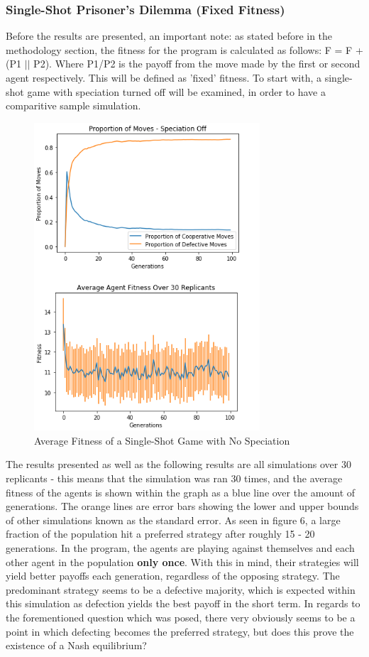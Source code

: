 \documentclass[12pt,a4paper]{article}
\begin{document}
\subsubsection{Single-Shot Prisoner's Dilemma (Fixed Fitness)}

Before the results are presented, an important note: as stated before in the methodology section, the fitness for the program is calculated as follows: F = F + (P1 $||$  P2). Where P1/P2 is the payoff from the move made by the first or second agent respectively. This will be defined as 'fixed' fitness. To start with, a single-shot game with speciation turned off will be examined, in order to have a comparitive sample simulation.

\begin{figure}[H]
	\centering
		\includegraphics[width=0.75\textwidth]{RatioSpeciationOff}
		\caption{Average Fitness of a Single-Shot Game with No Speciation}
\end{figure}

The results presented as well as the following results are all simulations over 30 replicants - this means that the simulation was ran 30 times, and the average fitness of the agents is shown within the graph as a blue line over the amount of generations. The orange lines are error bars showing the lower and upper bounds of other simulations known as the standard error. As seen in figure 6, a large fraction of the population hit a preferred strategy after roughly 15 - 20 generations. In the program, the agents are playing against themselves and each other agent in the population \textbf{only once}. With this in mind, their strategies will yield better payoffs each generation, regardless of the opposing strategy. The predominant strategy seems to be a defective majority, which is expected within this simulation as defection yields the best payoff in the short term. In regards to the forementioned question which was posed, there very obviously seems to be a point in which defecting becomes the preferred strategy, but does this prove the existence of a Nash equilibrium?
\end{document}
